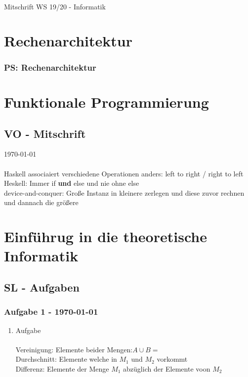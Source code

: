 \documentclass[12pt]{article}
\begin{document}
\begin{titlepage}
\begin{center}
Mitschrift WS 19/20 - Informatik
\end{center}
\tableofcontents

\end{titlepage}
\section{Rechenarchitektur}
\subsubsection{PS: Rechenarchitektur}



\newpage
\section{Funktionale Programmierung}
\subsection{VO - Mitschrift}


\today\\\\
Haskell associaiert verschiedene Operationen anders: left to right /  right to left
Heskell: Immer if \textbf{und} else und nie ohne else\\
device-and-conquer: Große Instanz in kleinere zerlegen und diese zuvor rechnen und dannach die größere


\newpage
\section{Einführug in die theoretische Informatik}
\subsection{SL - Aufgaben}
\subsubsection{Aufgabe 1 - \today}
\begin{enumerate}
\item Aufgabe \\\\
Vereinigung: Elemente beider Mengen:$ A \cup B = $ \\
Durchschnitt: Elemente welche in $M_1$ und $M_2$ vorkommt\\
Differenz: Elemente der Menge $M_1$ abzüglich der Elemente voon $M_2$\\


\end{enumerate}
\newpage
\end{document}
